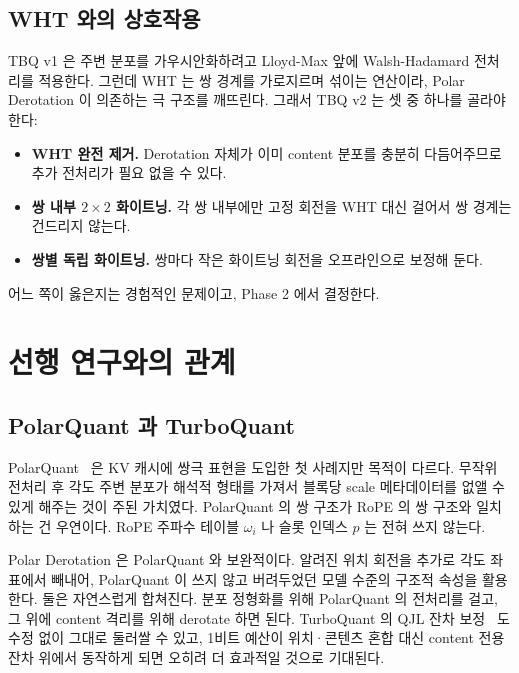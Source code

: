 \documentclass[10pt,twocolumn]{article}
\begin{document}
\subsection{WHT 와의 상호작용}

TBQ v1 은 주변 분포를 가우시안화하려고 Lloyd-Max 앞에 Walsh-Hadamard 전처리를 적용한다. 그런데 WHT 는 쌍 경계를 가로지르며 섞이는 연산이라, Polar Derotation 이 의존하는 극 구조를 깨뜨린다. 그래서 TBQ v2 는 셋 중 하나를 골라야 한다:
\begin{itemize}[leftmargin=*,topsep=1pt,itemsep=0pt]
\item \textbf{WHT 완전 제거.} Derotation 자체가 이미 content 분포를 충분히 다듬어주므로 추가 전처리가 필요 없을 수 있다.
\item \textbf{쌍 내부 $2\times 2$ 화이트닝.} 각 쌍 내부에만 고정 회전을 WHT 대신 걸어서 쌍 경계는 건드리지 않는다.
\item \textbf{쌍별 독립 화이트닝.} 쌍마다 작은 화이트닝 회전을 오프라인으로 보정해 둔다.
\end{itemize}
어느 쪽이 옳은지는 경험적인 문제이고, Phase 2 에서 결정한다.

\section{선행 연구와의 관계}
\label{sec:related}

\subsection{PolarQuant 과 TurboQuant}

PolarQuant~\cite{polarquant2025} 은 KV 캐시에 쌍극 표현을 도입한 첫 사례지만 목적이 다르다. 무작위 전처리 후 각도 주변 분포가 해석적 형태를 가져서 블록당 scale 메타데이터를 없앨 수 있게 해주는 것이 주된 가치였다. PolarQuant 의 쌍 구조가 RoPE 의 쌍 구조와 일치하는 건 우연이다. RoPE 주파수 테이블 $\omega_i$ 나 슬롯 인덱스 $p$ 는 전혀 쓰지 않는다.

Polar Derotation 은 PolarQuant 와 보완적이다. 알려진 위치 회전을 추가로 각도 좌표에서 빼내어, PolarQuant 이 쓰지 않고 버려두었던 모델 수준의 구조적 속성을 활용한다. 둘은 자연스럽게 합쳐진다. 분포 정형화를 위해 PolarQuant 의 전처리를 걸고, 그 위에 content 격리를 위해 derotate 하면 된다. TurboQuant 의 QJL 잔차 보정~\cite{turboquant2026} 도 수정 없이 그대로 둘러쌀 수 있고, 1비트 예산이 위치·콘텐츠 혼합 대신 content 전용 잔차 위에서 동작하게 되면 오히려 더 효과적일 것으로 기대된다.
\end{document}
